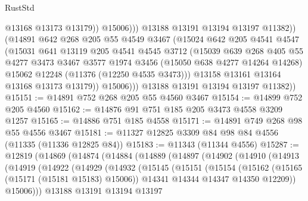 \begin{lexlean}{RustStd}
\begin{coremodule}
{\begin{coremodule}
{{{{{{{{{{{{{{{{{{{{{{{{{{{{{{{{{{{{{{{{{{{{{{{{{{{{{{{{{{{{{{{{{{{{{{{{{{{{{{{{{{{{{                          @13168
                          @13173
                          @13179))
                      @15006)))
                @13188
                @13191
                @13194
                @13197
                @11382))
            (@14891
              @642
              @268
              @205
              @55
              @4549
              @3467
              (@15024
                @642
                @205
                @4541
                @4547
                (@15031
                  @641
                  @13119
                  @205
                  @4541
                  @4545
                  @3712
                  (@15039
                    @639
                    @268
                    @405
                    @55
                    @4277
                    @3473
                    @3467
                    @3577
                    @1974
                    @3456
                    (@15050 @638 @4277 @14264 @14268)
                    @15062
                    @12248
                    (@11376 (@12250 @4535 @3473)))
                  @13158
                  @13161
                  @13164
                  @13168
                  @13173
                  @13179))
              @15006)))
        @13188
        @13191
        @13194
        @13197
        @11382))
@15151 := @14891 @752 @268 @205 @55 @4560 @3467
@15154 := @14899 @752 @205 @4560
@15162 := @14876 @91 @751 @185 @205 @3473 @4558 @3209 @1257
@15165 := @14886 @751 @185 @4558
@15171 := @14891 @749 @268 @98 @55 @4556 @3467
@15181 := @11327 @12825 @3309 @84 @98 @84 @4556 (@11335 (@11336 @12825 @84))
@15183 := @11343 (@11344 @4556)
@15287 := @12819
    (@14869
      (@14874
        (@14884
          (@14889
            (@14897
              (@14902
                (@14910
                  (@14913
                    (@14919
                      (@14922
                        (@14929
                          (@14932
                            (@15145
                              (@15151
                                (@15154
                                  (@15162
                                    (@15165 (@15171 (@15181 @15183) @15006))
                                    @14341
                                    @14344
                                    @14347
                                    @14350
                                    @12209))
                                @15006)))
                          @13188
                          @13191
                          @13194
                          @13197
}}}}}}}}}}}}}}}}}}}}}}}}}}}}}}}}}}}}}}}}}}}}}}}}}}}}}}}}}}}}}}}}}}}}}}}}}}}}}}}}}}}}}
\end{coremodule}}
\end{coremodule}
\end{lexlean}
